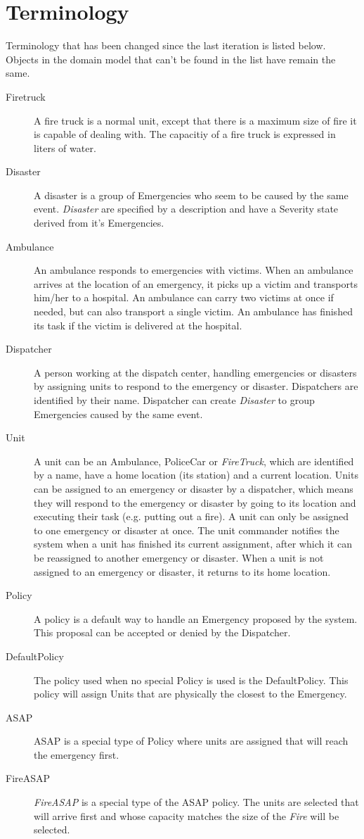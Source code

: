 \section{Terminology}
Terminology that has been changed since the last iteration is listed below. Objects in the domain model that can't be found in the list have remain the same.
\begin{description}
  \item[Firetruck] A fire truck is a normal unit, except that there is a maximum size of fire it is capable of dealing with. The capacitiy of a fire truck is expressed in liters of water.
  \item[Disaster] A disaster is a group of Emergencies who seem to be caused by the same event. \textit{Disaster} are specified by a description and have a Severity state derived from it's Emergencies.
  \item[Ambulance] An ambulance responds to emergencies with victims. When an ambulance arrives at the location of an emergency, it picks up a victim and transports him/her to a hospital. An ambulance can carry two victims at once if needed, but can also transport a single victim. An ambulance has finished its task if the victim is delivered at the hospital. 
  \item[Dispatcher] A person working at the dispatch center, handling emergencies or disasters by assigning units to respond to the emergency or disaster. Dispatchers are identified by their name. Dispatcher can create \textit{Disaster} to group Emergencies caused by the same event.
  \item[Unit] A unit can be an Ambulance, PoliceCar or \textit{FireTruck}, which are identified by a name, have a home location (its station) and a current location. Units can be assigned to an emergency or disaster by a dispatcher, which means they will respond to the emergency or disaster by going to its location and executing their task (e.g. putting out a fire). A unit can only be assigned to one emergency or disaster at once. The unit commander notifies the system when a unit has finished its current assignment, after which it can be reassigned to another emergency or disaster. When a unit is not assigned to an emergency or disaster, it returns to its home location.
  \item[Policy] A policy is a default way to handle an Emergency proposed by the system. This proposal can be accepted or denied by the Dispatcher.
  \item[DefaultPolicy] The policy used when no special Policy is used is the DefaultPolicy. This policy will assign Units that are physically the closest to the Emergency.
  \item[ASAP] ASAP is a special type of Policy where units are assigned that will reach the emergency first.
  \item[FireASAP] \textit{FireASAP} is a special type of the ASAP policy. The units are selected that will arrive first and whose capacity matches the size of the \textit{Fire} will be selected.
\end{description}
